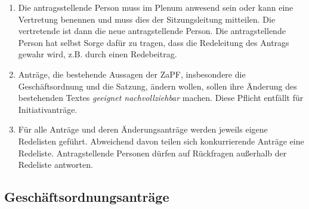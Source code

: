 \documentclass[
  ngerman,
  a4paper,
  oneside]{scrartcl}
\begin{document}
\begin{enumerate}
  Anfangsplenum müssen mindestens 7 Tage vor dem Anfangsplenum geeignet
  bekanntgemacht werden, z.B. über die Mailingliste. Genaueres regelt
  eine Selbstverpflichtung. Zur Abstimmung im Zwischen- oder Endplenum
  müssen Anträge zur Änderung des Verhaltenskodex der ZaPF spätestens um
  15:00 Uhr am Tag vor dem Zwischen- oder Endplenum bekanntgegeben
  werden. Änderungen des Verhaltenskodex der ZaPF sind nicht durch
  Initiativanträge möglich. Die Änderung des Verhaltenskodex tritt
  sofort in Kraft.
\item
  Die antragsstellende Person muss im Plenum anwesend sein oder kann
  eine Vertretung benennen und muss dies der Sitzungsleitung mitteilen.
  Die vertretende ist dann die neue antragstellende Person. Die
  antragstellende Person hat selbst Sorge dafür zu tragen, dass die
  Redeleitung des Antrags gewahr wird, z.B. durch einen Redebeitrag.
\item
  Anträge, die bestehende Aussagen der ZaPF, insbesondere die
  Geschäftsordnung und die Satzung, ändern wollen, sollen ihre Änderung
  des bestehenden Textes \emph{geeignet nachvollziehbar} machen. Diese
  Pflicht entfällt für Initiativanträge.
\item
  Für alle Anträge und deren Änderungsanträge werden jeweils eigene
  Redelisten geführt. Abweichend davon teilen sich konkurrierende
  Anträge eine Redeliste. Antragstellende Personen dürfen auf Rückfragen
  außerhalb der Redeliste antworten.
\end{enumerate}

\subsection{Geschäftsordnungsanträge}\label{geschuxe4ftsordnungsantruxe4ge}
\end{document}
